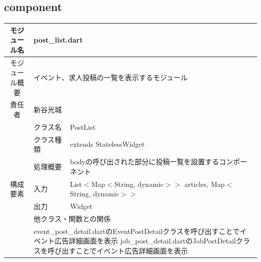 \subsection{component}\label{sec:component}

\begin{table}[H]
  \centering
  \begin{tabular}{|c|l|l|} \hline
    モジュール名                & \multicolumn{2}{l|}{post\_list.dart}                                                                                        \\ \hline
    モジュール概要               & \multicolumn{2}{p{12cm}|}{イベント、求人投稿の一覧を表示するモジュール}                                                                            \\ \hline
    責任者                   & \multicolumn{2}{l|}{新谷光城}                                                                                                   \\ \hline
    \multirow{7}{*}{構成要素} & クラス名                                             & PostList                                                                 \\ \cline{2-3}
                          & クラス種類                                            & extends StatelessWidget                                                  \\ \cline{2-3}
                          & 処理概要                                             & \multicolumn{1}{p{12cm}|}{bodyの呼び出された部分に投稿一覧を設置するコンポーネント}                \\ \cline{2-3}
                          & 入力                                               & List$<$Map$<$String, dynamic$>$$>$ articles, Map$<$String, dynamic$>$$>$ \\ \cline{2-3}
                          & 出力                                               & Widget                                                                   \\ \cline{2-3}
                          & \multicolumn{2}{l|}{他クラス・関数との関係}                                                                                            \\ \cline{2-3}
                          & \multicolumn{2}{p{14cm}|}{
      event\_post\_detail.dartのEventPostDetailクラスを呼び出すことでイベント広告詳細画面を表示
    \newline job\_post\_detail.dartのJobPostDetailクラスを呼び出すことでイベント広告詳細画面を表示}                                                                              \\ \hline
  \end{tabular}
\end{table}\par
\ \par
\ \par
\ \par


